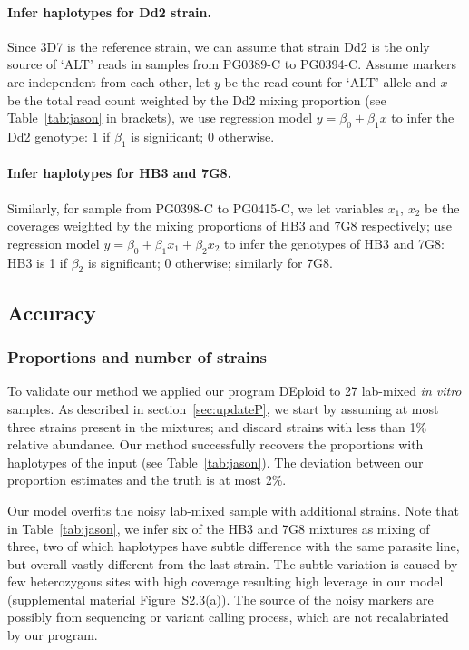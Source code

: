 \documentclass{bioinfo}
\begin{document}
\paragraph{Infer haplotypes for Dd2 strain.}
Since 3D7 is the reference strain, we can assume that strain Dd2 is the only source of `ALT' reads in samples from {\textmd PG0389-C} to {\textmd PG0394-C}. Assume markers are independent from each other, let $y$ be the read count for `ALT' allele and $x$ be the total read count weighted by the Dd2 mixing proportion (see Table~\ref{tab:jason} in brackets), we use regression model $y = \beta_0 + \beta_{1} x$ to infer the Dd2 genotype: 1 if $\beta_{1}$ is significant; 0 otherwise.

\paragraph{Infer haplotypes for HB3 and 7G8.}
Similarly, for sample from {\textmd PG0398-C} to {\textmd PG0415-C}, we let variables $x_1$, $x_2$ be the coverages weighted by the mixing proportions of HB3 and 7G8 respectively; use regression model $y = \beta_0 + \beta_{1} x_1 + \beta_{2} x_2$ to infer the genotypes of HB3 and 7G8: HB3 is 1 if $\beta_{2}$ is significant; 0 otherwise; similarly for 7G8.

\subsection{Accuracy}
\subsubsection{Proportions and number of strains}
To validate our method we applied our program {\textmd DEploid} to 27 lab-mixed {\em in vitro} samples. As described in section~\ref{sec:updateP}, we start by assuming at most three strains present in the mixtures; and discard strains with less than 1\% relative abundance. Our method successfully recovers the proportions with haplotypes of the input (see Table~\ref{tab:jason}). The deviation between our proportion estimates and the truth is at most 2\%.

Our model overfits the noisy lab-mixed sample with additional strains. Note that in Table~\ref{tab:jason}, we infer six of the HB3 and 7G8 mixtures as mixing of three, two of which haplotypes have subtle difference with the same parasite line, but overall vastly different from the last strain. The subtle variation is caused by few heterozygous sites with high coverage resulting high leverage in our model (supplemental material Figure~S2.3(a)). The source of the noisy markers are possibly from sequencing or variant calling process, which are not recalabriated by our program.
\end{document}
